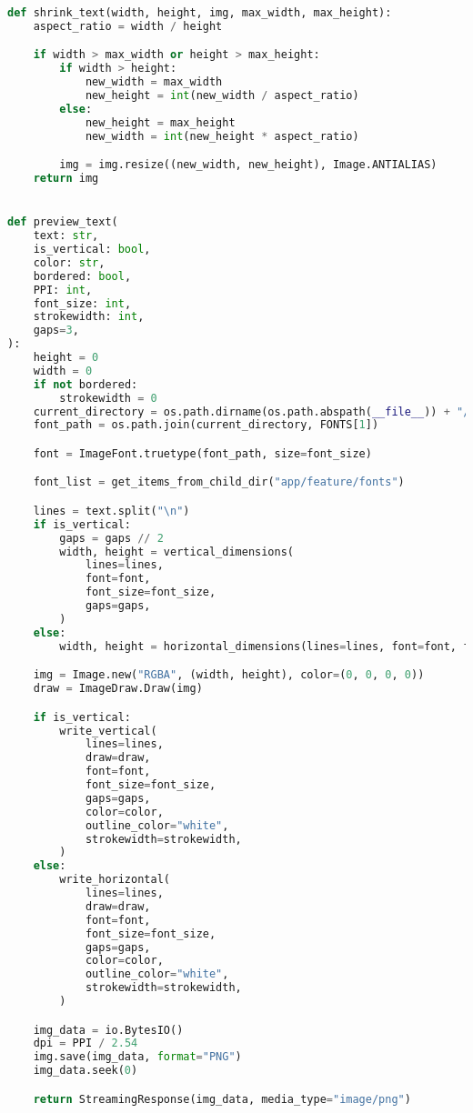 \begin{lstlisting}[language=Python,caption={Text-ээс PNG зураг үүсгэдэг script},frame=single]
def shrink_text(width, height, img, max_width, max_height):
    aspect_ratio = width / height

    if width > max_width or height > max_height:
        if width > height:
            new_width = max_width
            new_height = int(new_width / aspect_ratio)
        else:
            new_height = max_height
            new_width = int(new_height * aspect_ratio)

        img = img.resize((new_width, new_height), Image.ANTIALIAS)
    return img


def preview_text(
    text: str,
    is_vertical: bool,
    color: str,
    bordered: bool,
    PPI: int,
    font_size: int,
    strokewidth: int,
    gaps=3,
):
    height = 0
    width = 0
    if not bordered:
        strokewidth = 0
    current_directory = os.path.dirname(os.path.abspath(__file__)) + "/fonts"
    font_path = os.path.join(current_directory, FONTS[1])

    font = ImageFont.truetype(font_path, size=font_size)

    font_list = get_items_from_child_dir("app/feature/fonts")

    lines = text.split("\n")
    if is_vertical:
        gaps = gaps // 2
        width, height = vertical_dimensions(
            lines=lines,
            font=font,
            font_size=font_size,
            gaps=gaps,
        )
    else:
        width, height = horizontal_dimensions(lines=lines, font=font, font_size=font_size, gaps=gaps)

    img = Image.new("RGBA", (width, height), color=(0, 0, 0, 0))
    draw = ImageDraw.Draw(img)

    if is_vertical:
        write_vertical(
            lines=lines,
            draw=draw,
            font=font,
            font_size=font_size,
            gaps=gaps,
            color=color,
            outline_color="white",
            strokewidth=strokewidth,
        )
    else:
        write_horizontal(
            lines=lines,
            draw=draw,
            font=font,
            font_size=font_size,
            gaps=gaps,
            color=color,
            outline_color="white",
            strokewidth=strokewidth,
        )

    img_data = io.BytesIO()
    dpi = PPI / 2.54
    img.save(img_data, format="PNG")
    img_data.seek(0)

    return StreamingResponse(img_data, media_type="image/png")



\end{lstlisting}
